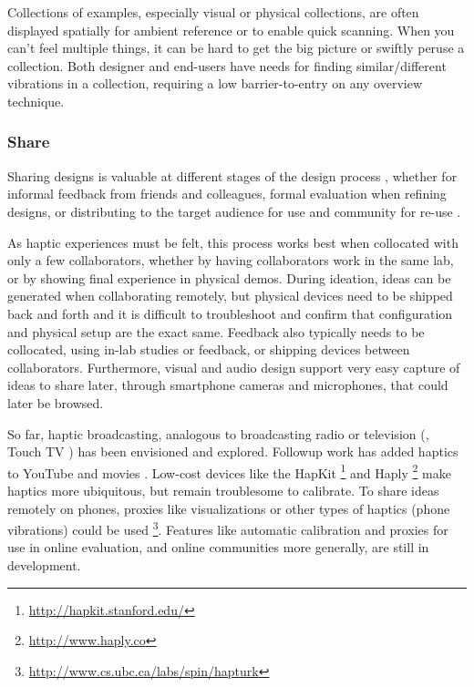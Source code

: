     Collections of examples, especially visual or physical collections, are often displayed spatially for ambient reference or to enable quick scanning.
    When you can't feel multiple things, it can be hard to get the big picture or swiftly peruse a collection.
    Both designer and end-users have needs for finding similar/different vibrations in a collection, requiring a low barrier-to-entry on any overview technique.



%
%
\subsubsection{Share} 
Sharing designs is valuable at different stages of the design process \cite{Kulkarni2012}, whether for informal feedback from friends and colleagues, formal evaluation when refining designs, or distributing to the target audience for use and community for re-use \cite{Shneiderman2007}.

As haptic experiences must be felt, this process works best when collocated with only a few collaborators, whether by having collaborators work in the same lab, or by showing final experience in physical demos.
During ideation, ideas can be generated when collaborating remotely, but physical devices need to be shipped back and forth and it is difficult to troubleshoot and confirm that configuration and physical setup are the exact same.
Feedback also typically needs to be collocated, using in-lab studies or feedback, or shipping devices between collaborators.
Furthermore, visual and audio design support very easy capture of ideas to share later, through smartphone cameras and microphones, that could later be browsed.

So far, haptic broadcasting, analogous to broadcasting radio or television (\eg, Touch TV \cite{Modhrain2001}) has been envisioned and explored.
Followup work has added haptics to YouTube \cite{AbdurRahman2010} and movies \cite{Kim2009}.
Low-cost devices like the HapKit \cite{Martinez2016}\footnote{\url{http://hapkit.stanford.edu/}} and Haply \cite{Gallacher2016}\footnote{\url{http://www.haply.co}} make haptics more ubiquitous, but remain troublesome to calibrate.
To share ideas remotely on phones, proxies like visualizations or other types of haptics (phone vibrations) could be used \cite{Schneider2016b}\footnote{\url{http://www.cs.ubc.ca/labs/spin/hapturk}}.
Features like automatic calibration and proxies for use in online evaluation, and online communities more generally, are still in development.




